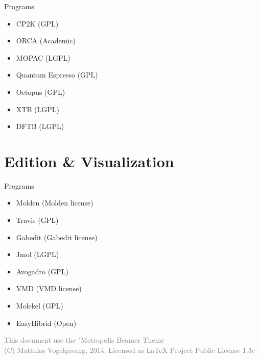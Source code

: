\documentclass[10pt]{beamer}
\begin{document}
\begin{frame}[fragile]{Programs}
  \begin{itemize}
      \item CP2K (GPL)
      \item ORCA (Academic)
      \item MOPAC (LGPL)
      \item Quantum Espresso (GPL)
      \item Octopus (GPL)
      \item XTB (LGPL)
      \item DFTB (LGPL)
  \end{itemize}
\end{frame}


\section[Edit]{Edition \& Visualization}

\begin{frame}[fragile]{Programs}
  \begin{itemize}
      \item Molden (Molden license)
      \item Travis (GPL)
      \item Gabedit (Gabedit license)
      \item Jmol (LGPL)
      \item Avogadro (GPL)
      \item VMD (VMD license)
      \item Molekel (GPL)
      \item EasyHibrid (Open)
  \end{itemize}
\end{frame}

\begin{frame}
    \textcolor{gray}{This document use the "Metropolis Beamer Theme\\
    (C) Matthias Vogelgesang, 2014. Licensed as LaTeX Project Public License 1.3c }
\end{frame}
\end{document}
